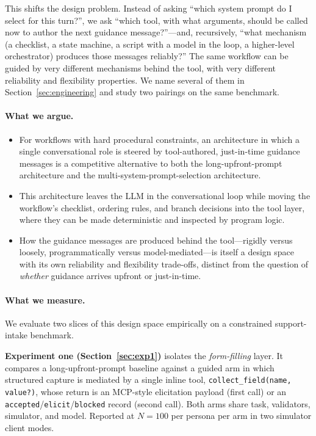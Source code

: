\documentclass[11pt,a4paper]{article}
\newcommand{\rerunPlaceholderN}{100}
\begin{document}
This shifts the design problem. Instead of asking ``which system prompt do I select for this turn?'', we ask ``which tool, with what arguments, should be called now to author the next guidance message?''---and, recursively, ``what mechanism (a checklist, a state machine, a script with a model in the loop, a higher-level orchestrator) produces those messages reliably?'' The same workflow can be guided by very different mechanisms behind the tool, with very different reliability and flexibility properties. We name several of them in Section~\ref{sec:engineering} and study two pairings on the same benchmark.

\paragraph{What we argue.}
\begin{itemize}[noitemsep]
\item For workflows with hard procedural constraints, an architecture in which a single conversational role is steered by tool-authored, just-in-time guidance messages is a competitive alternative to both the long-upfront-prompt architecture and the multi-system-prompt-selection architecture.
\item This architecture leaves the LLM in the conversational loop while moving the workflow's checklist, ordering rules, and branch decisions into the tool layer, where they can be made deterministic and inspected by program logic.
\item How the guidance messages are produced behind the tool---rigidly versus loosely, programmatically versus model-mediated---is itself a design space with its own reliability and flexibility trade-offs, distinct from the question of \emph{whether} guidance arrives upfront or just-in-time.
\end{itemize}

\paragraph{What we measure.} We evaluate two slices of this design space empirically on a constrained support-intake benchmark.

\textbf{Experiment one (Section~\ref{sec:exp1})} isolates the \emph{form-filling} layer. It compares a long-upfront-prompt baseline against a guided arm in which structured capture is mediated by a single inline tool, \texttt{collect\_field(name, value?)}, whose return is an MCP-style elicitation payload (first call) or an \texttt{accepted}/\texttt{elicit}/\texttt{blocked} record (second call). Both arms share task, validators, simulator, and model. Reported at $N=\rerunPlaceholderN$ per persona per arm in two simulator client modes.
\end{document}
